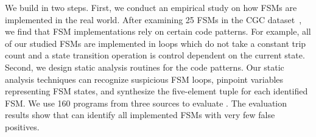We build \Tool{} in two steps. First, we conduct an empirical study 
on how FSMs are implemented in the real world. After examining 25 FSMs in the CGC 
dataset~\cite{CGC}, we find that FSM implementations rely on certain code patterns. 
For example, all of our studied FSMs are implemented in 
loops which do not take a constant trip count and a state transition operation 
is control dependent on the current state. 
Second, we design static analysis routines for the code patterns.
Our static analysis techniques can recognize suspicious FSM loops,
pinpoint variables representing FSM states, 
and synthesize the five-element tuple for each identified FSM. 
We use 160 programs from three sources to evaluate \Tool{}.
The evaluation results show that \Tool{} can identify all implemented FSMs 
with very few false positives. 







